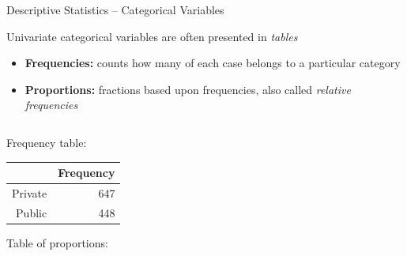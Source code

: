 \documentclass{beamer}
\begin{document}
\begin{frame}{Descriptive Statistics -- Categorical Variables}

{\footnotesize
Univariate categorical variables are often presented in \textit{tables}
\begin{itemize}
	\item \textbf{Frequencies:} counts how many of each case belongs to a particular category
	\item \textbf{Proportions:} fractions based upon frequencies, also called \textit{relative frequencies}
\end{itemize}
}

\vspace{3mm}

\begin{columns}

  \begin{column}{0.45\textwidth}
 {\small
Frequency table:
\begin{table}[ht]
\centering
\begin{tabular}{rr}
  \hline
 & Frequency \\ 
  \hline
Private & 647 \\ 
  Public & 448 \\ 
   \hline
\end{tabular}
\end{table}

Table of proportions:

}
\end{column}
\end{columns}
\end{frame}
\end{document}
